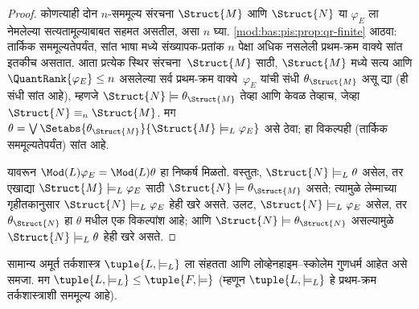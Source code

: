 \begin{proof}
कोणत्याही दोन $n$-सममूल्य संरचना $\Struct{M}$ आणि
$\Struct{N}$ या $\varphi_{E}$ ला नेमलेल्या सत्यतामूल्याबाबत सहमत असतील, असा $n$
घ्या. \ref{mod:bas:pis:prop:qr-finite} आठवा: तार्किक सममूल्यतेपर्यंत,
सांत भाषा मध्ये संख्यापक-प्रतांक $n$ पेक्षा अधिक नसलेली प्रथम-क्रम
वाक्ये सांत इतकीच असतात. आता प्रत्येक स्थिर
संरचना~$\Struct{M}$ साठी, $\Struct{M}$ मध्ये सत्य आणि
$\QuantRank{\varphi_{E}} \le n$ असलेल्या सर्व प्रथम-क्रम वाक्ये~$\varphi_{E}$
यांची संधी $\theta_{\Struct{M}}$ असू द्या (ही संधी सांत आहे), म्हणजे
$\Struct{N} \models \theta_{\Struct{M}}$ तेव्हा आणि केवळ तेव्हाच, जेव्हा
$\Struct{N} \equiv_n \Struct{M}$. मग $\theta = \textstyle\bigvee
\Setabs{\theta_{\Struct{M}}}{\Struct{M} \models_L \varphi_{E}}$ असे ठेवा; हा विकल्पही
(तार्किक सममूल्यतेपर्यंत) सांत आहे.

यावरून $\Mod(L){\varphi_{E}} = \Mod(L){\theta}$ हा निष्कर्ष मिळतो. वस्तुतः,
$\Struct{N} \models_L \theta$ असेल, तर एखाद्या $\Struct{M} \models_L
\varphi_{E}$ साठी $\Struct{N} \models \theta_{\Struct{M}}$ असते; त्यामुळे
लेम्माच्या गृहीतकानुसार $\Struct{N} \models_L \varphi_{E}$ हेही खरे असते.
उलट, $\Struct{N} \models_L \varphi_{E}$ असेल, तर $\theta_\Struct{N}$ हा $\theta$ मधील
एक विकल्पांश आहे; आणि $\Struct{N} \models \theta_\Struct{N}$ असल्यामुळे
$\Struct{N} \models_L \theta$ हेही खरे असते.
\end{proof}

\begin{thm}[लिंडस्ट्रॉमचे प्रमेय]
  \label{mod:lin:prf:thm:lindstrom} सामान्य अमूर्त तर्कशास्त्र
  $\tuple{L, \models_L}$ ला संहतता आणि लोव्हेनहाइम--स्कोलेम गुणधर्म
  आहेत असे समजा. मग $\tuple{L, \models_L} \le \tuple{F, \models}$
  (म्हणून $\tuple{L, \models_L}$ हे प्रथम-क्रम तर्कशास्त्राशी सममूल्य
  आहे).

\end{thm}

